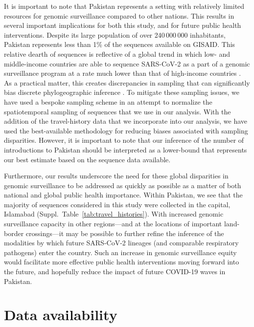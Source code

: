 It is important to note that Pakistan represents a setting with relatively limited resources for genomic surveillance compared to other nations.
This results in several important implications for both this study, and for future public health interventions.
Despite its large population of over 240\,000\,000 inhabitants, Pakistan represents less than 1\% of the sequences available on GISAID.
This relative dearth of sequences is reflective of a global trend in which low- and middle-income countries are able to sequence SARS-CoV-2 as a part of a genomic surveillance program at a rate much lower than that of high-income countries \citep{brito2022global}.
As a practical matter, this creates discrepancies in sampling that can significantly bias discrete phylogeographic inference \citep{layan2023impact}.
To mitigate these sampling issues, we have used a bespoke sampling scheme in an attempt to normalize the spatiotemporal sampling of sequences that we use in our analysis.
With the addition of the travel-history data that we incorporate into our analysis, we have used the best-available methodology for reducing biases associated with sampling disparities.
However, it is important to note that our inference of the number of introductions to Pakistan should be interpreted as a lower-bound that represents our best estimate based on the sequence data available.

Furthermore, our results underscore the need for these global disparities in genomic surveillance to be addressed as quickly as possible as a matter of both national and global public health importance.
Within Pakistan, we see that the majority of sequences considered in this study were collected in the capital, Islamabad (Suppl.~Table~\ref{tab:travel_histories}).
With increased genomic surveillance capacity in other regions---and at the locations of important land-border crossings---it may be possible to further refine the inference of the modalities by which future SARS-CoV-2 lineages (and comparable respiratory pathogens) enter the country.
Such an increase in genomic surveillance equity would facilitate more effective public health interventions moving forward into the future, and hopefully reduce the impact of future COVID-19 waves in Pakistan.

\section*{Data availability}

